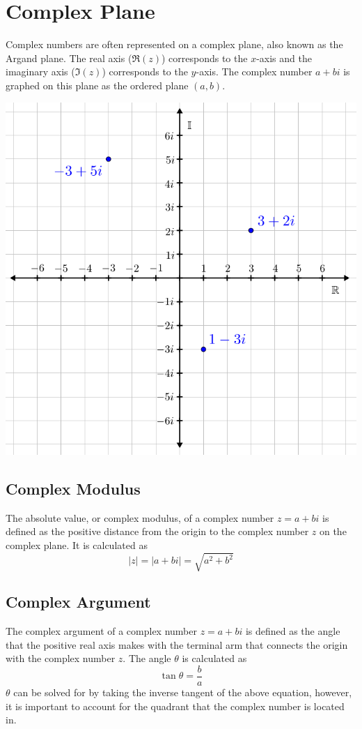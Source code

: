 \documentclass[12pt]{article}
\begin{document}
\section{Complex Plane}
Complex numbers are often represented on a complex plane, also known as the Argand plane. The real axis ($\Re(z)$) corresponds to the $x$-axis and the imaginary axis ($\Im(z)$) corresponds to the $y$-axis. The complex number $a + bi$ is graphed on this plane as the ordered plane $(a, b)$.
\begin{center}
    \includegraphics[scale = 0.25]{Graphics/Week_12/ArgandPlane.png}
\end{center}

\subsection{Complex Modulus}
The absolute value, or complex modulus, of a complex number $z=a + bi$ is defined as the positive distance from the origin to the complex number $z$ on the complex plane. It is calculated as $$|z|=|a + bi| = \sqrt{a^2 + b^2}$$

\subsection{Complex Argument}
The complex argument of a complex number $z = a + bi$ is defined as the angle that the positive real axis makes with the terminal arm that connects the origin with the complex number $z$. The angle $\theta$ is calculated as $$\tan{\theta} = \frac{b}{a}$$ $\theta$ can be solved for by taking the inverse tangent of the above equation, however, it is important to account for the quadrant that the complex number is located in.
\end{document}
